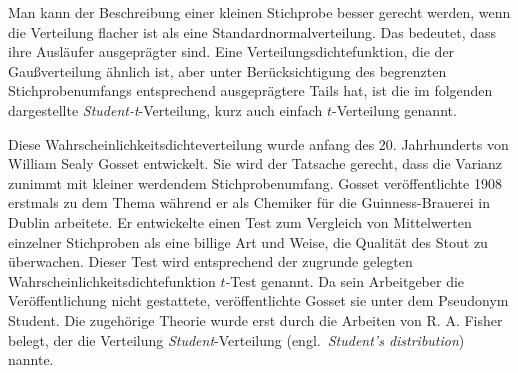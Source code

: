 
Man kann der Beschreibung einer kleinen Stichprobe besser gerecht werden, wenn die
Verteilung flacher ist als eine Standardnormalverteilung. Das bedeutet, dass ihre Ausläufer
ausgeprägter sind.
Eine Verteilungsdichtefunktion, die der Gaußverteilung ähnlich ist, aber unter
Berücksichtigung des begrenzten Stichprobenumfangs entsprechend ausgeprägtere Tails hat,
ist die im folgenden dargestellte \textsl{Student-t}-Verteilung, kurz auch
einfach $t$-Verteilung genannt.


Diese Wahrscheinlichkeitsdichteverteilung wurde anfang des 20. Jahrhunderts von
William Sealy Gosset entwickelt. Sie wird der
Tatsache gerecht, dass die Varianz zunimmt mit kleiner werdendem Stichprobenumfang.
Gosset veröffentlichte 1908 erstmals zu dem Thema während er als Chemiker für die Guinness-Brauerei
in Dublin arbeitete. Er entwickelte einen Test zum Vergleich von Mittelwerten
einzelner Stichproben als eine billige Art und Weise, die Qualität des Stout
zu überwachen. Dieser Test wird entsprechend der zugrunde gelegten Wahrscheinlichkeitsdichtefunktion
$t$-Test genannt.
Da sein Arbeitgeber die Veröffentlichung nicht gestattete, veröffentlichte Gosset sie unter
dem Pseudonym Student. Die zugehörige Theorie wurde erst durch die
Arbeiten von R. A. Fisher belegt, der die Verteilung \textsl{Student}-Verteilung (engl.\
\textsl{Student's distribution}) nannte.

